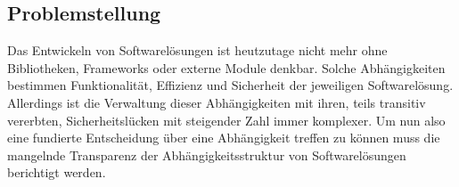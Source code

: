 \subsection{Problemstellung} \label{subsec:Problemstellung}
    Das Entwickeln von Softwarelösungen ist heutzutage nicht mehr ohne Bibliotheken, Frameworks oder externe Module denkbar.
    Solche Abhängigkeiten bestimmen Funktionalität, Effizienz und Sicherheit der jeweiligen Softwarelösung.
    Allerdings ist die Verwaltung dieser Abhängigkeiten mit ihren, teils transitiv vererbten, Sicherheitslücken mit steigender Zahl immer komplexer.
    Um nun also eine fundierte Entscheidung über eine Abhängigkeit treffen zu können muss die mangelnde Transparenz der Abhängigkeitsstruktur von Softwarelösungen berichtigt werden.